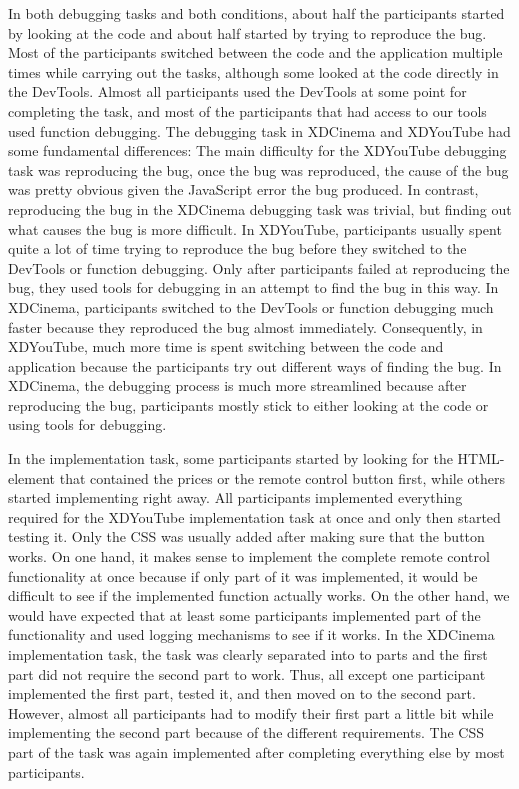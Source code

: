 In both debugging tasks and both conditions, about half the participants started by looking at the code and about half started by trying to reproduce the bug. Most of the participants switched between the code and the application multiple times while carrying out the tasks, although some looked at the code directly in the DevTools. Almost all participants used the DevTools at some point for completing the task, and most of the participants that had access to our tools used function debugging. The debugging task in XDCinema and XDYouTube had some fundamental differences: The main difficulty for the XDYouTube debugging task was reproducing the bug, once the bug was reproduced, the cause of the bug was pretty obvious given the JavaScript error the bug produced. In contrast, reproducing the bug in the XDCinema debugging task was trivial, but finding out what causes the bug is more difficult. In XDYouTube, participants usually spent quite a lot of time trying to reproduce the bug before they switched to the DevTools or function debugging. Only after participants failed at reproducing the bug, they used tools for debugging in an attempt to find the bug in this way. In XDCinema, participants switched to the DevTools or function debugging much faster because they reproduced the bug almost immediately. Consequently, in XDYouTube, much more time is spent switching between the code and application because the participants try out different ways of finding the bug. In XDCinema, the debugging process is much more streamlined because after reproducing the bug, participants mostly stick to either looking at the code or using tools for debugging.

In the implementation task, some participants started by looking for the HTML-element that contained the prices or the remote control button first, while others started implementing right away. All participants implemented everything required for the XDYouTube implementation task at once and only then started testing it. Only the CSS was usually added after making sure that the button works. On one hand, it makes sense to implement the complete remote control functionality at once because if only part of it was implemented, it would be difficult to see if the implemented function actually works. On the other hand, we would have expected that at least some participants implemented part of the functionality and used logging mechanisms to see if it works. In the XDCinema implementation task, the task was clearly separated into to parts and the first part did not require the second part to work. Thus, all except one participant implemented the first part, tested it, and then moved on to the second part. However, almost all participants had to modify their first part a little bit while implementing the second part because of the different requirements. The CSS part of the task was again implemented after completing everything else by most participants.

